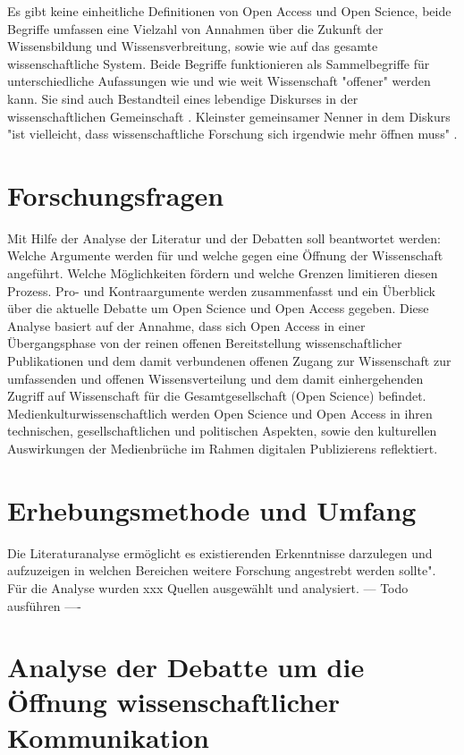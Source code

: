 Es gibt keine einheitliche Definitionen von Open Access und Open Science, beide Begriffe umfassen eine Vielzahl von Annahmen über die Zukunft der Wissensbildung und Wissensverbreitung, sowie wie auf das gesamte wissenschaftliche System. Beide Begriffe funktionieren als Sammelbegriffe für unterschiedliche Aufassungen wie und wie weit Wissenschaft "offener" werden kann. Sie sind auch Bestandteil eines lebendige Diskurses in der wissenschaftlichen Gemeinschaft \cite{schulze_2013_open}. Kleinster gemeinsamer Nenner in dem Diskurs "ist vielleicht, dass wissenschaftliche Forschung sich irgendwie mehr öffnen muss" \cite{cite:9}.

\section{Forschungsfragen} 

Mit Hilfe der Analyse der Literatur und der Debatten soll beantwortet werden: Welche Argumente werden für und welche gegen eine Öffnung der Wissenschaft angeführt. Welche Möglichkeiten fördern und welche Grenzen limitieren diesen Prozess. Pro- und Kontraargumente werden zusammenfasst und ein Überblick über die aktuelle Debatte um Open Science und Open Access gegeben. Diese Analyse basiert auf der Annahme, dass sich Open Access in einer Übergangsphase von der reinen offenen Bereitstellung wissenschaftlicher Publikationen und dem damit verbundenen offenen Zugang zur Wissenschaft zur umfassenden und offenen Wissensverteilung und dem damit einhergehenden Zugriff auf Wissenschaft für die Gesamtgesellschaft (Open Science) befindet. Medienkulturwissenschaftlich werden Open Science und Open Access in ihren technischen, gesellschaftlichen und politischen Aspekten, sowie den kulturellen Auswirkungen der Medienbrüche im Rahmen digitalen Publizierens reflektiert.

\section{Erhebungsmethode und Umfang} 

Die Literaturanalyse ermöglicht es existierenden Erkenntnisse darzulegen und aufzuzeigen in welchen Bereichen weitere Forschung angestrebt werden sollte"\cite{webster2002analyzing}. Für die Analyse wurden xxx Quellen ausgewählt und analysiert. --- Todo ausführen ----

\section{Analyse der Debatte um die Öffnung wissenschaftlicher Kommunikation} 

